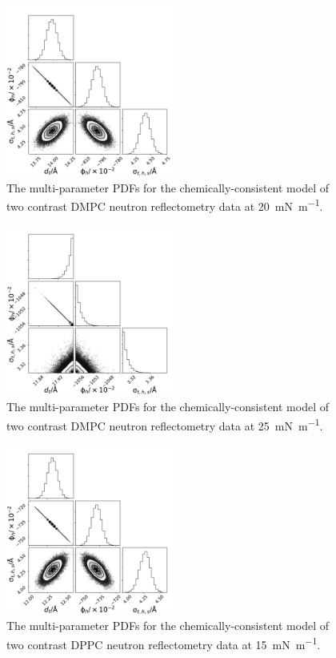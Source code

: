 \documentclass[amsmath,amssymb,superscriptaddress]{revtex4-1}
\begin{document}
\begin{figure}[H]
	\centering
	\includegraphics[width=0.50\textwidth]{figures/dmpc_20n_all_corner}
	\caption{The multi-parameter PDFs for the chemically-consistent model of two contrast DMPC neutron reflectometry data at \SI{20}{\milli\newton\per\meter}.}
	\label{fig:dmpcn1}
\end{figure}
\begin{figure}[H]
	\centering
	\includegraphics[width=0.50\textwidth]{figures/dmpc_25n_all_corner}
	\caption{The multi-parameter PDFs for the chemically-consistent model of two contrast DMPC neutron reflectometry data at \SI{25}{\milli\newton\per\meter}.}
	\label{fig:dmpcn2}
\end{figure}
\begin{figure}[H]
	\centering
	\includegraphics[width=0.50\textwidth]{figures/dppc_15n_all_corner}
	\caption{The multi-parameter PDFs for the chemically-consistent model of two contrast DPPC neutron reflectometry data at \SI{15}{\milli\newton\per\meter}.}
	\label{fig:dppcn1}
\end{figure}
\end{document}
